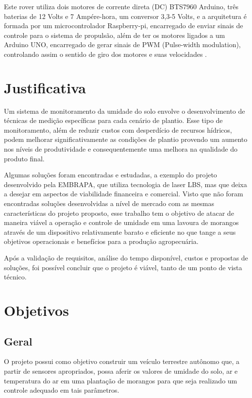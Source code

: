   Este rover utiliza dois motores de corrente direta (DC) BTS7960 Arduino, três
  baterias de 12 Volts e 7 Ampére-hora, um conversor 3,3-5 Volts, e a arquitetura
  é formada por um microcontrolador Raspberry-pi, encarregado de enviar sinais
  de controle para o sistema de propulsão, além de ter os motores ligados a um
  Arduino UNO, encarregado de gerar sinais de PWM (Pulse-width modulation),
  controlando assim o sentido de giro dos motores e suas velocidades \cite{ARGOTE2014}.

  \section{Justificativa}

  Um sistema de monitoramento da umidade do solo envolve o desenvolvimento de
  técnicas de medição específicas para cada cenário de plantio. Esse tipo de
  monitoramento, além de reduzir custos com desperdício de recursos hídricos,
  podem melhorar significativamente as condições de plantio provendo um aumento
  nos níveis de produtividade e consequentemente uma melhora na qualidade do
  produto final.

  Algumas soluções foram encontradas e estudadas, a exemplo do projeto
  desenvolvido pela EMBRAPA, que utiliza tecnologia de laser LBS, mas que deixa
  a desejar em aspectos de viabilidade financeira e comercial. Visto que não
  foram encontradas soluções desenvolvidas a nível de mercado com as mesmas
  características do projeto proposto, esse trabalho tem o objetivo de atacar
  de maneira viável a operação e controle de umidade em uma lavoura de morangos
  através de um dispositivo relativamente barato e eficiente no que tange a seus
  objetivos operacionais e benefícios para a produção agropecuária.

  Após a validação de requisitos, análise do tempo disponível, custos e propostas
  de soluções, foi possível concluir que o projeto é viável, tanto de um ponto
  de vista técnico.

  \section{Objetivos}

  \subsection{Geral}

  O projeto possui como objetivo construir um veículo terrestre autônomo que,
  a partir de sensores apropriados, possa aferir os valores de umidade do solo,
  ar e temperatura do ar em uma plantação de morangos para que seja realizado
  um controle adequado em tais parâmetros.


